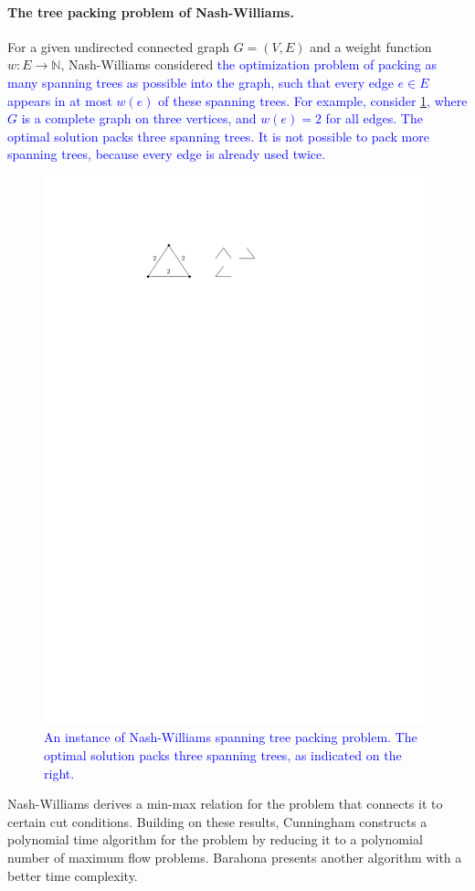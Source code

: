 \documentclass[runningheads]{llncs}
\newcommand{\NN}{\mathbb{N}}
\newcommand{\lasse}[1]{\textcolor{blue}{#1}}
\begin{document}
\paragraph{The tree packing problem of Nash-Williams.}
For a given undirected connected graph $G=(V,E)$ and a weight function $w:E\to\NN$,
Nash-Williams \cite{Nash-Williams1961} considered \lasse{the optimization problem of packing as many 
spanning trees as possible into the graph, such that every edge $e \in E$ appears in at most $w(e)$ of these spanning trees. 
For example, consider \cref{fig_spt_example}, where $G$ is a complete graph on three vertices, 
and $w(e) = 2$ for all edges. The optimal solution packs three spanning trees. It is not possible to pack more spanning trees, because every edge is already used twice.} 
\begin{figure}[htpb]
\centering
\includegraphics[scale=1]{img/stp-example}
\caption{\lasse{An instance of Nash-Williams spanning tree packing problem. The optimal solution packs three spanning trees, as indicated on the right.}}
\label{fig_spt_example}
\end{figure}
Nash-Williams \cite{Nash-Williams1961} derives a min-max relation for the problem that connects it to certain cut conditions.
Building on these results, Cunningham \cite{Cunningham1985} constructs a polynomial time 
algorithm for the problem by reducing it to a polynomial number of maximum flow problems.
Barahona \cite{Barahona1995} presents another algorithm with a better time complexity.
\end{document}
